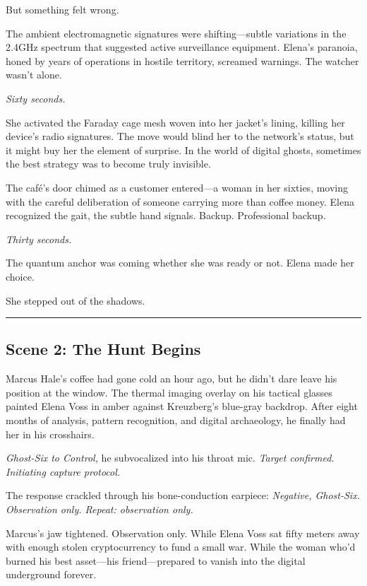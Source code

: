 But something felt wrong.

The ambient electromagnetic signatures were shifting---subtle variations in the 2.4GHz spectrum that suggested active surveillance equipment. Elena's paranoia, honed by years of operations in hostile territory, screamed warnings. The watcher wasn't alone.

\emph{Sixty seconds.}

She activated the Faraday cage mesh woven into her jacket's lining, killing her device's radio signatures. The move would blind her to the network's status, but it might buy her the element of surprise. In the world of digital ghosts, sometimes the best strategy was to become truly invisible.

The café's door chimed as a customer entered---a woman in her sixties, moving with the careful deliberation of someone carrying more than coffee money. Elena recognized the gait, the subtle hand signals. Backup. Professional backup.

\emph{Thirty seconds.}

The quantum anchor was coming whether she was ready or not. Elena made her choice.

She stepped out of the shadows.

\begin{center}\rule{0.5\linewidth}{0.5pt}\end{center}

\hypertarget{scene-2-the-hunt-begins}{%
\subsection{Scene 2: The Hunt Begins}\label{scene-2-the-hunt-begins}}

Marcus Hale's coffee had gone cold an hour ago, but he didn't dare leave his position at the window. The thermal imaging overlay on his tactical glasses painted Elena Voss in amber against Kreuzberg's blue-gray backdrop. After eight months of analysis, pattern recognition, and digital archaeology, he finally had her in his crosshairs.

\emph{Ghost-Six to Control,} he subvocalized into his throat mic. \emph{Target confirmed. Initiating capture protocol.}

The response crackled through his bone-conduction earpiece: \emph{Negative, Ghost-Six. Observation only. Repeat: observation only.}

Marcus's jaw tightened. Observation only. While Elena Voss sat fifty meters away with enough stolen cryptocurrency to fund a small war. While the woman who'd burned his best asset---his friend---prepared to vanish into the digital underground forever.

